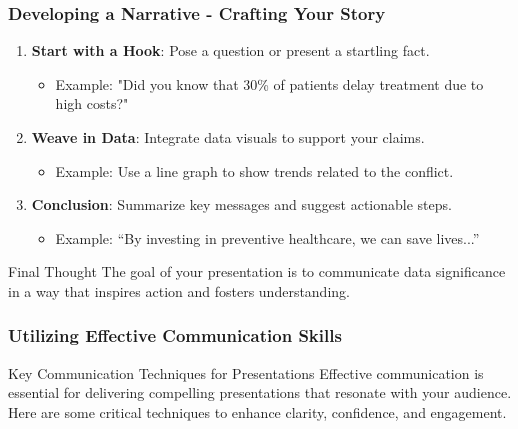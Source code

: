 \documentclass[aspectratio=169]{beamer}
\begin{document}
\begin{frame}[fragile]
  \frametitle{Developing a Narrative - Crafting Your Story}
  \begin{enumerate}
    \item \textbf{Start with a Hook}: Pose a question or present a startling fact.
      \begin{itemize}
        \item Example: "Did you know that 30\% of patients delay treatment due to high costs?"
      \end{itemize}
    
    \item \textbf{Weave in Data}: Integrate data visuals to support your claims.
      \begin{itemize}
        \item Example: Use a line graph to show trends related to the conflict.
      \end{itemize}
    
    \item \textbf{Conclusion}: Summarize key messages and suggest actionable steps.
      \begin{itemize}
        \item Example: “By investing in preventive healthcare, we can save lives...”
      \end{itemize}
  \end{enumerate}
  
  \begin{block}{Final Thought}
    The goal of your presentation is to communicate data significance in a way that inspires action and fosters understanding.
  \end{block}
\end{frame}

\begin{frame}[fragile]
    \frametitle{Utilizing Effective Communication Skills}
    \begin{block}{Key Communication Techniques for Presentations}
        Effective communication is essential for delivering compelling presentations that resonate with your audience. Here are some critical techniques to enhance clarity, confidence, and engagement.
    \end{block}
\end{frame}
\end{document}
